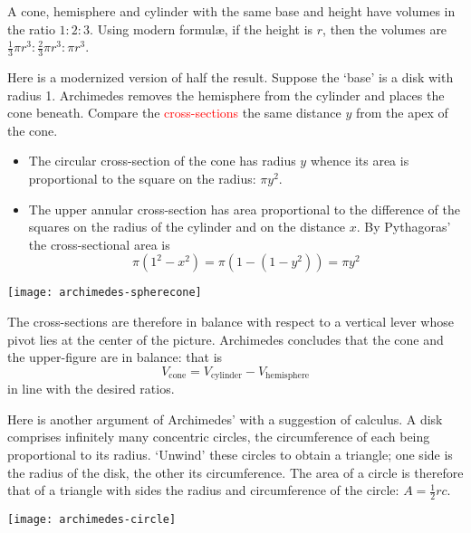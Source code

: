 \begin{thm*}{}{}
	A cone, hemisphere and cylinder with the same base and height have volumes in the ratio $1:2:3$. Using modern formulæ, if the height is $r$, then the volumes are $\frac 13\pi r^3:\frac 23\pi r^3:\pi r^3$.
\end{thm*}
\label{pg:archmethod}

\begin{minipage}[t]{0.67\linewidth}\vspace{-3pt}
	Here is a modernized version of half the result. Suppose the `base' is a disk with radius 1. Archimedes removes the hemisphere from the cylinder and places the cone beneath. Compare the \textcolor{red}{cross-sections} the same distance $y$ from the apex of the cone.
	\begin{itemize}\itemsep0pt
	  \item The circular cross-section of the cone has radius $y$ whence its area is proportional to the square on the radius: $\pi y^2$.
		\item The upper annular cross-section has area proportional to the difference of the squares on the radius of the cylinder and on the distance $x$. By Pythagoras' the cross-sectional area is
		\[
			\pi(1^2-x^2)=\pi(1-(1-y^2))=\pi y^2
		\]
	\end{itemize}
\end{minipage}
\hfill
\begin{minipage}[t]{0.32\linewidth}\vspace{-3pt}
	\flushright
	\texttt{[image: archimedes-spherecone]}
\end{minipage}
\bigbreak
The cross-sections are therefore in balance with respect to a vertical lever whose pivot lies at the center of the picture. Archimedes concludes that the cone and the upper-figure are in balance: that is
\[
	V_\text{cone}=V_\text{cylinder}-V_\text{hemisphere}
\]
in line with the desired ratios.
\bigbreak


Here is another argument of Archimedes' with a suggestion of calculus. A disk comprises infinitely many concentric circles, the circumference of each being proportional to its radius. `Unwind' these circles to obtain a triangle; one side is the radius of the disk, the other its circumference. The area of a circle is therefore that of a triangle with sides the radius and circumference of the circle: $A=\frac 12rc$.
\begin{center}
	\texttt{[image: archimedes-circle]}
\end{center}

